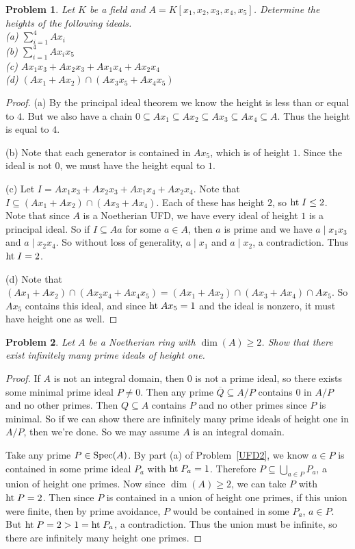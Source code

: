 \documentclass{article}
\newcommand{\spec}{\textup{Spec}}
\newcommand{\Ht}{\textup{ht}\;}
\newtheorem{problem}{Problem}
\begin{document}
\begin{problem}
Let $K$ be a field and $A = K[x_1, x_2, x_3, x_4, x_5]$. Determine the heights of the following ideals.\\
(a) $\sum_{i=1}^4 Ax_i$\\
(b) $\sum_{i=1}^4 Ax_ix_5$\\
(c) $Ax_1x_3 + Ax_2x_3 + Ax_1x_4 + Ax_2x_4$\\
(d) $(Ax_1 + Ax_2) \cap (Ax_3x_5 + Ax_4x_5)$\\
\end{problem}
\begin{proof}
(a) By the principal ideal theorem we know the height is less than or equal to $4$. But we also have a chain $0 \subseteq Ax_1 \subseteq Ax_2 \subseteq Ax_3 \subseteq Ax_4 \subseteq A$. Thus the height is equal to $4$.

(b) Note that each generator is contained in $Ax_5$, which is of height $1$. Since the ideal is not $0$, we must have the height equal to $1$.

(c) Let $I = Ax_1x_3 + Ax_2x_3 + Ax_1x_4 + Ax_2x_4$. Note that $I \subseteq (Ax_1 + Ax_2) \cap (Ax_3 + Ax_4)$. Each of these has height $2$, so $\Ht I \leq 2$. Note that since $A$ is a Noetherian UFD, we have every ideal of height $1$ is a principal ideal. So if $I \subseteq Aa$ for some $a \in A$, then $a$ is prime and we have $a \mid x_1x_3$ and $a \mid x_2x_4$. So without loss of generality, $a \mid x_1$ and $a \mid x_2$, a contradiction. Thus $\Ht I = 2$.

(d) Note that $(Ax_1 + Ax_2) \cap (Ax_3x_4 + Ax_4x_5) = (Ax_1 + Ax_2) \cap (Ax_3 + Ax_4) \cap Ax_5$. So $Ax_5$ contains this ideal, and since $\Ht Ax_5 = 1$ and the ideal is nonzero, it must have height one as well.
\end{proof}

\begin{problem}
\label{infiniteones}
Let $A$ be a Noetherian ring with $\dim(A) \geq 2$. Show that there exist infinitely many prime ideals of height one.
\end{problem}
\begin{proof}
If $A$ is not an integral domain, then $0$ is not a prime ideal, so there exists some minimal prime ideal $P \neq 0$. Then any prime $\overline{Q} \subseteq A/P$ contains $0$ in $A/P$ and no other primes. Then $Q \subseteq A$ contains $P$ and no other primes since $P$ is minimal. So if we can show there are infinitely many prime ideals of height one in $A/P$, then we're done. So we may assume $A$ is an integral domain.

Take any prime $P \in \spec(A)$. By part (a) of Problem~\ref{UFD2}, we know $a \in P$ is contained in some prime ideal $P_a$ with $\Ht P_a = 1$. Therefore $P \subseteq \bigcup_{a \in P} P_a$, a union of height one primes. Now since $\dim(A) \geq 2$, we can take $P$ with $\Ht P = 2$. Then since $P$ is contained in a union of height one primes, if this union were finite, then by prime avoidance, $P$ would be contained in some $P_a$, $a \in P$. But $\Ht P = 2 > 1 = \Ht P_a$, a contradiction. Thus the union must be infinite, so there are infinitely many height one primes.
\end{proof}
\end{document}
